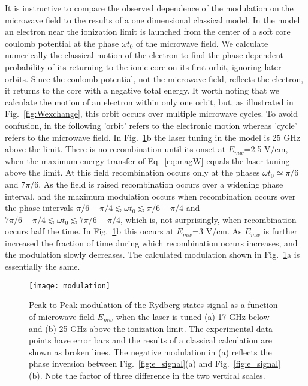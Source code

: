 \documentclass[pra, reprint]{revtex4-1}
\begin{document}
It is instructive to compare the observed dependence of the modulation on the microwave field to the results of a one dimensional classical model. In the model an electron near the ionization limit is launched from the center of a soft core coulomb potential at the phase $\omega t_0$ of the microwave field\cite{Eberly_1992}. We calculate numerically the classical motion of the electron to find the phase dependent probability of its returning to the ionic core on its first orbit, ignoring later orbits. Since the coulomb potential, not the microwave field, reflects the electron, it returns to the core with a negative total energy. It worth noting that we calculate the motion of an electron within only one orbit, but, as illustrated in Fig.~\ref{fig:Wexchange}, this orbit occurs over multiple microwave cycles. To avoid confusion, in the following 'orbit' refers to the electronic motion whereas 'cycle' refers to the microwave field. In Fig.~\ref{fig:e_modulation}b the laser tuning in the model is 25 GHz above the limit. There is no recombination until its onset at $E_{mw}$=2.5 V/cm, when the maximum energy transfer of Eq.~\eqref{eq:magW} equals the laser tuning above the limit. At this field recombination occurs only at the phases $\omega t_0 \simeq \pi/6$ and $7\pi/6$. As the field is raised recombination occurs over a widening phase interval, and the maximum modulation occurs when recombination occurs over the phase intervals $\pi/6-\pi/4\lesssim \omega t_0\lesssim \pi/6+\pi/4$ and $7\pi/6-\pi/4\lesssim \omega t_0\lesssim 7\pi/6+\pi/4$, which is, not surprisingly, when recombination occurs half the time. In Fig.~\ref{fig:e_modulation}b this occurs at $E_{mw}$=3 V/cm. As $E_{mw}$ is further increased the fraction of time during which recombination occurs increases, and the modulation slowly decreases. The calculated modulation shown in Fig.~\ref{fig:e_modulation}a is essentially the same.


\begin{figure}[h]
  \texttt{[image: modulation]}
  \caption{Peak-to-Peak modulation of the Rydberg states signal as a function of microwave field $E_{mw}$ when the laser is tuned (a) 17 GHz below and (b) 25 GHz above the ionization limit. The experimental data points have error bars and the results of a classical calculation are shown as broken lines. The negative modulation in (a) reflects the phase inversion between Fig.~\ref{fig:e_signal}(a) and Fig.~\ref{fig:e_signal}(b). Note the factor of three difference in the two vertical scales.}
  \label{fig:e_modulation}
\end{figure}
\end{document}
